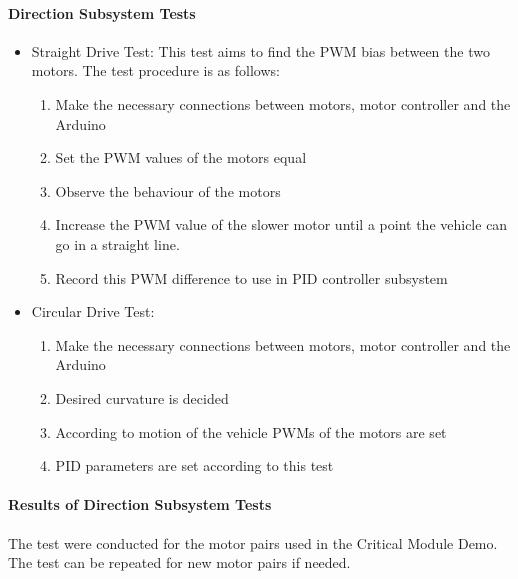 \documentclass[a4paper,12pt]{article}
\begin{document}
	\paragraph{Direction Subsystem Tests}
	\begin{itemize}
	
		\item Straight Drive Test:
			This test aims to find the PWM bias between the two motors. The test procedure is as follows:
			\begin{enumerate}
				\item Make the necessary connections between motors, motor controller and the Arduino \vspace{-0.2cm}
				\item Set the PWM values of the motors equal \vspace{-0.2cm}
				\item Observe the behaviour of the motors \vspace{-0.2cm}
				\item Increase the PWM value of the slower motor until a point the vehicle can go in a straight line.
				\item Record this PWM difference to use in PID controller subsystem
			\end{enumerate}
				
			\newpage
		
		\item Circular Drive Test:
			\begin{enumerate}
				\item Make the necessary connections between motors, motor controller and the Arduino \vspace{-0.2cm}
				\item Desired curvature is decided \vspace{-0.2cm}
				\item  According to motion of the vehicle PWMs of the motors are set \vspace{-0.2cm}
				\item  PID parameters are set according to this test
			\end{enumerate}
		
		
	\end{itemize}
	
	\paragraph{Results of Direction Subsystem Tests}
		
		The test were conducted for the motor pairs used in the Critical Module Demo. The test can be repeated for new motor pairs if needed.
	
\end{document}
